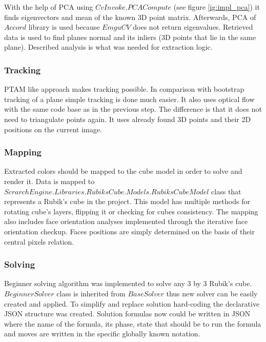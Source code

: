 \documentclass[../../main.tex]{subfiles}
\begin{document}
With the help of \ac{PCA} using $CvInvoke.PCACompute$ (see figure \ref{ig:impl_pca}) it finds eigenvectors and mean of the known 3D point matrix. Afterwards, \ac{PCA} of $Accord$ library is used because $EmguCV$ does not return eigenvalues. Retrieved data is used to find planes normal and its inliers (3D points that lie in the same plane). Described analysis is what was needed for extraction logic.

\subsubsection*{Tracking}

\ac{PTAM} like approach makes tracking possible. In comparison with bootstrap tracking of a plane simple tracking is done much easier. It also uses optical flow with the same code base as in the previous step. The difference is that it does not need to triangulate points again. It uses already found 3D points and their 2D positions on the current image.

\subsubsection*{Mapping}

Extracted colors should be mapped to the cube model in order to solve and render it. Data is mapped to $ScrarchEngine.Libraries.RubiksCube.Models.RubiksCubeModel$ class that represents a Rubik's cube in the project. This model has multiple methods for rotating cube's layers, flipping it or checking for cubes consistency. The mapping also includes face orientation analyses implemented through the iterative face orientation checkup. Faces positions are simply determined on the basis of their central pixels relation.

\subsubsection*{Solving}

Beginner solving algorithm was implemented to solve any 3 by 3 Rubik's cube. $BeginnerSolver$ class is inherited from $BaseSolver$ thus new solver can be easily created and applied. To simplify and replace solution hard-coding the declarative \ac{JSON} structure was created. Solution formulas now could be written in \ac{JSON} where the name of the formula, its phase, state that should be to run the formula and moves are written in the specific globally known notation.
\end{document}
